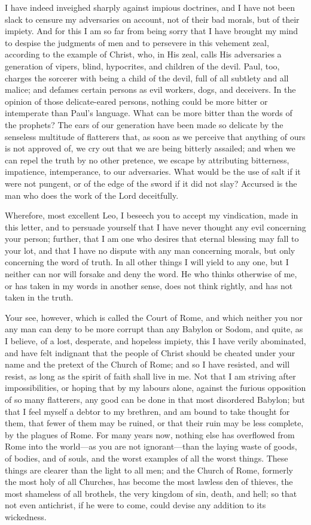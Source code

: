 I have indeed inveighed sharply against impious doctrines, and I have not
been slack to censure my adversaries on account, not of their bad morals,
but of their impiety. And for this I am so far from being sorry that I
have brought my mind to despise the judgments of men and to persevere in
this vehement zeal, according to the example of Christ, who, in His zeal,
calls His adversaries a generation of vipers, blind, hypocrites, and
children of the devil. Paul, too, charges the sorcerer with being a child
of the devil, full of all subtlety and all malice; and defames certain
persons as evil workers, dogs, and deceivers. In the opinion of those
delicate-eared persons, nothing could be more bitter or intemperate than
Paul's language. What can be more bitter than the words of the prophets?
The ears of our generation have been made so delicate by the senseless
multitude of flatterers that, as soon as we perceive that anything of ours
is not approved of, we cry out that we are being bitterly assailed; and
when we can repel the truth by no other pretence, we escape by attributing
bitterness, impatience, intemperance, to our adversaries. What would be
the use of salt if it were not pungent, or of the edge of the sword if it
did not slay? Accursed is the man who does the work of the Lord
deceitfully.

Wherefore, most excellent Leo, I beseech you to accept my vindication,
made in this letter, and to persuade yourself that I have never thought
any evil concerning your person; further, that I am one who desires that
eternal blessing may fall to your lot, and that I have no dispute with any
man concerning morals, but only concerning the word of truth. In all other
things I will yield to any one, but I neither can nor will forsake and
deny the word. He who thinks otherwise of me, or has taken in my words in
another sense, does not think rightly, and has not taken in the truth.

Your see, however, which is called the Court of Rome, and which neither
you nor any man can deny to be more corrupt than any Babylon or Sodom, and
quite, as I believe, of a lost, desperate, and hopeless impiety, this I
have verily abominated, and have felt indignant that the people of Christ
should be cheated under your name and the pretext of the Church of Rome;
and so I have resisted, and will resist, as long as the spirit of faith
shall live in me. Not that I am striving after impossibilities, or hoping
that by my labours alone, against the furious opposition of so many
flatterers, any good can be done in that most disordered Babylon; but that
I feel myself a debtor to my brethren, and am bound to take thought for
them, that fewer of them may be ruined, or that their ruin may be less
complete, by the plagues of Rome. For many years now, nothing else has
overflowed from Rome into the world—as you are not ignorant—than
the laying waste of goods, of bodies, and of souls, and the worst examples
of all the worst things. These things are clearer than the light to all
men; and the Church of Rome, formerly the most holy of all Churches, has
become the most lawless den of thieves, the most shameless of all
brothels, the very kingdom of sin, death, and hell; so that not even
antichrist, if he were to come, could devise any addition to its
wickedness.

